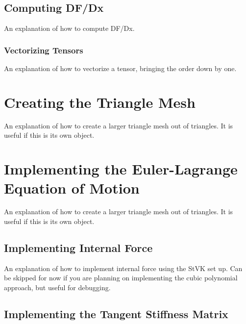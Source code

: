 \documentclass[twocolumn,10pt]{asme2ej}
\begin{document}
\subsection{Computing DF/Dx}

An explanation of how to compute DF/Dx.

\subsubsection{Vectorizing Tensors}

An explanation of how to vectorize a tensor, bringing the order down by one.

\section{Creating the Triangle Mesh}

An explanation of how to create a larger triangle mesh out of triangles. It is useful if this is its own
object.

\section{Implementing the Euler-Lagrange Equation of Motion}

An explanation of how to create a larger triangle mesh out of triangles. It is useful if this is its own
object.

\subsection{Implementing Internal Force}

An explanation of how to implement internal force using the StVK set up. Can be skipped for now if you are
planning on implementing the cubic polynomial approach, but useful for debugging.

\subsection{Implementing the Tangent Stiffness Matrix}
\end{document}
